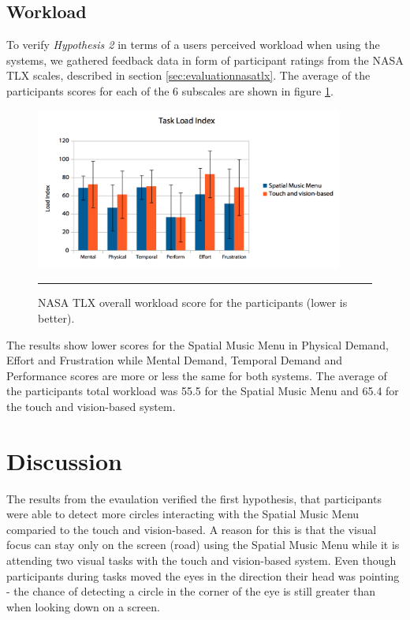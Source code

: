\subsection{Workload}
To verify \textit{Hypothesis 2} in terms of a users perceived workload when using the systems, we gathered feedback data in form of participant ratings from the NASA TLX scales, described in section \ref{sec:evaluationnasatlx}. The average of the participants scores for each of the 6 subscales are shown in figure \ref{fig:resultsnasatlx}.

\begin{figure}[h]
	\centering
		\includegraphics[width=0.9\textwidth,height=\textheight,keepaspectratio]{./Figures/results_taskloadindex.png}
		\rule{35em}{1pt}
	\caption[Results NASA TLX Score]{NASA TLX overall workload score for the participants (lower is better).}
	\label{fig:resultsnasatlx}
\end{figure}

The results show lower scores for the Spatial Music Menu in Physical Demand, Effort and Frustration while Mental Demand, Temporal Demand and Performance scores are more or less the same for both systems. The average of the participants total workload was 55.5 for the Spatial Music Menu and 65.4 for the touch and vision-based system.


\section{Discussion}
The results from the evaulation verified the first hypothesis, that participants were able to detect more circles interacting with the Spatial Music Menu comparied to the touch and vision-based. A reason for this is that the visual focus can stay only on the screen (road) using the Spatial Music Menu while it is attending two visual tasks with the touch and vision-based system. Even though participants during tasks moved the eyes in the direction their head was pointing - the chance of detecting a circle in the corner of the eye is still greater than when looking down on a screen.

